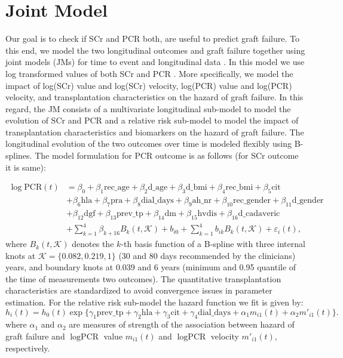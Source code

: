 
\section{Joint Model}
\label{sec : joint_model}
Our goal is to check if SCr and PCR both, are useful to predict graft failure. To this end, we model the two longitudinal outcomes and graft failure together using joint models (JMs) for time to event and longitudinal data \citep{tsiatis2004joint,rizopoulos2012joint}. In this model we use log transformed values of both SCr and PCR \citep{fournier2016joint}. More specifically, we model the impact of log(SCr) value and log(SCr) velocity, log(PCR) value and log(PCR) velocity, and transplantation characteristics on the hazard of graft failure. In this regard, the JM consists of a multivariate longitudinal sub-model to model the evolution of SCr and PCR and a relative risk sub-model to model the impact of transplantation characteristics and biomarkers on the hazard of graft failure. The longitudinal evolution of the two outcomes over time is modeled flexibly using B-splines. The model formulation for PCR outcome is as follows (for SCr outcome it is same):

\begin{equation}
\label{eq : long_model_prias}
\begin{aligned}
\log \mbox{PCR}(t) &= \beta_0 + \beta_1 \mbox{rec\_age} + \beta_2 \mbox{d\_age} + \beta_3 \mbox{d\_bmi} + \beta_4 \mbox{rec\_bmi} + \beta_5 \mbox{cit}\\
&+ \beta_6 \mbox{hla} + \beta_7 \mbox{pra}+ \beta_8 \mbox{dial\_days} + \beta_9 \mbox{ah\_nr} + \beta_{10} \mbox{rec\_gender} + \beta_{11} \mbox{d\_gender} \\
&+ \beta_{12} \mbox{dgf} + \beta_{13} \mbox{prev\_tp} + \beta_{14} \mbox{dm} + \beta_{15} \mbox{hvdis}+ \beta_{16} \mbox{d\_cadaveric}\\
&+\sum_{k=1}^4 \beta_{k+16} B_k(t,\mathcal{K}) +  b_{i0} + \sum_{k=1}^4 b_{ik} B_k(t,\mathcal{K}) + 
\varepsilon_i(t),
\end{aligned}
\end{equation}
where $B_k(t, \mathcal{K})$ denotes the $k$-th basis function of a B-spline with three internal knots at $\mathcal{K} =\{0.082, 0.219, 1\}$ (30 and 80 days recommended by the clinicians) years, and boundary knots at 0.039 and 6 years (minimum and 0.95 quantile of the time of measurements two outcomes). The quantitative transplantation characteristics are standardized to avoid convergence issues in parameter estimation. For the relative risk sub-model the hazard function we fit is given by:
\begin{equation}
\label{eq : hazard_prias}
h_i(t) = h_0(t) \exp\big\{\gamma_1 \mbox{prev\_tp} + \gamma_2 \mbox{hla}  + \gamma_3 \mbox{cit} + \gamma_4 \mbox{dial\_days} + \alpha_1 m_{i1}(t) + \alpha_2 m'_{i1}(t)\big\}.
\end{equation}
where $\alpha_1$ and $\alpha_2$ are measures of strength of the association between hazard of graft failure and $\log \mbox{PCR}$ value $m_{i1}(t)$ and $\log \mbox{PCR}$ velocity $m'_{i1}(t)$, respectively.

